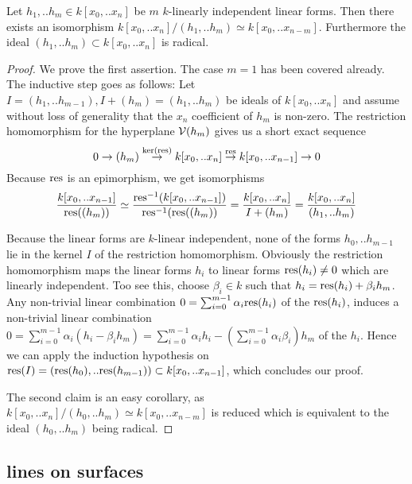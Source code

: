 \begin{corollary} \label{thm:multires}
Let $h_1,.. h_m \in k[x_0,..x_n]$ be $m$ $k$-linearly independent linear forms.
Then there exists an isomorphism $k[x_0,..x_n]/(h_1,..h_m) \simeq k[x_0,..x_{n-m}]$.
Furthermore the ideal $(h_1,..h_m)\subset k[x_0,..x_n]$ is radical.
\end{corollary}
\begin{proof}
We prove the first assertion.
The case $m=1$ has been covered already.
The inductive step goes as follows:
Let $I = (h_1,..h_{m-1}), I+(h_m) = (h_1,..h_m)$ be ideals of $k[x_0,..x_n]$ and assume without loss of generality that the $x_n$ coefficient of $h_m$ is non-zero.
The restriction homomorphism for the hyperplane $\operatorname{\mathcal V}(h_m)$ gives us a short exact sequence
\begin{equation}
0 \to (h_m) \overset{\ker({\operatorname{res}})}\to k[x_0,..x_n] \overset{{\operatorname{res}}}\to k[x_0,..x_{n-1}] \to 0
\end{equation}
Because ${\operatorname{res}}$ is an epimorphism, we get isomorphisms
\begin{equation}
\frac{k[x_0,..x_{n-1}]}{{\operatorname{res}}((h_m))}
\simeq \frac{{\operatorname{res}}^{-1}(k[x_0,..x_{n-1}])}{{\operatorname{res}}^{-1}({\operatorname{res}}((h_m))}
= \frac{k[x_0,..x_n]}{I+(h_m)}
= \frac{k[x_0,..x_n]}{(h_1,..h_m)}
\end{equation}

Because the linear forms are $k$-linear independent, none of the forms $h_0,..h_{m-1}$ lie in the kernel $I$ of the restriction homomorphism.
Obviously the restriction homomorphism maps the linear forms $h_i$ to linear forms ${\operatorname{res}}(h_i) \neq 0$ which are linearly independent.
Too see this, choose $\beta_i \in k$ such that $h_i = {\operatorname{res}}(h_i) + \beta_i h_m$.
Any non-trivial linear combination $0 = \sum_{i=0}^{m-1} \alpha_i {\operatorname{res}}(h_i)$ of the ${\operatorname{res}}(h_i)$, induces a non-trivial linear combination $0 = \sum_{i=0}^{m-1} \alpha_i(h_i - \beta_i h_m) = \sum_{i=0}^{m-1}\alpha_i h_i - (\sum_{i=0}^{m-1} \alpha_i\beta_i)h_m$ of the $h_i$.
Hence we can apply the induction hypothesis on ${\operatorname{res}}(I) = ({\operatorname{res}}(h_0),..{\operatorname{res}}(h_{m-1})) \subset k[x_0,..x_{n-1}]$, which concludes our proof.


The second claim is an easy corollary, as $k[x_0,..x_n]/(h_0,..h_m) \simeq k[x_0,..x_{n-m}]$ is reduced which is equivalent to the ideal $(h_0,..h_m)$ being radical.

\end{proof}




\subsection{lines on surfaces}

